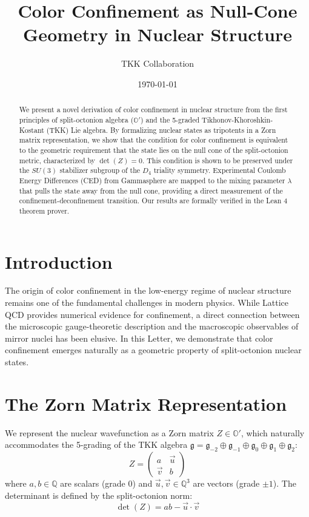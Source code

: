 \documentclass[aps,prl,reprint,superscriptaddress]{revtex4-2}
\begin{document}
\title{Color Confinement as Null-Cone Geometry in Nuclear Structure}

\author{TKK Collaboration}

\date{\today}

\begin{abstract}
We present a novel derivation of color confinement in nuclear structure from the first principles of split-octonion algebra ($\mathbb{O}'$) and the 5-graded Tikhonov-Khoroshkin-Kostant (TKK) Lie algebra. By formalizing nuclear states as tripotents in a Zorn matrix representation, we show that the condition for color confinement is equivalent to the geometric requirement that the state lies on the null cone of the split-octonion metric, characterized by $\det(Z) = 0$. This condition is shown to be preserved under the $SU(3)$ stabilizer subgroup of the $D_4$ triality symmetry. Experimental Coulomb Energy Differences (CED) from Gammasphere are mapped to the mixing parameter $\lambda$ that pulls the state away from the null cone, providing a direct measurement of the confinement-deconfinement transition. Our results are formally verified in the Lean 4 theorem prover.
\end{abstract}

\maketitle

\section{Introduction}
The origin of color confinement in the low-energy regime of nuclear structure remains one of the fundamental challenges in modern physics. While Lattice QCD provides numerical evidence for confinement, a direct connection between the microscopic gauge-theoretic description and the macroscopic observables of mirror nuclei has been elusive. In this Letter, we demonstrate that color confinement emerges naturally as a geometric property of split-octonion nuclear states.

\section{The Zorn Matrix Representation}
We represent the nuclear wavefunction as a Zorn matrix $Z \in \mathbb{O}'$, which naturally accommodates the 5-grading of the TKK algebra $\mathfrak{g} = \mathfrak{g}_{-2} \oplus \mathfrak{g}_{-1} \oplus \mathfrak{g}_{0} \oplus \mathfrak{g}_{1} \oplus \mathfrak{g}_{2}$:
\begin{equation}
Z = \begin{pmatrix} a & \vec{u} \\ \vec{v} & b \end{pmatrix}
\end{equation}
where $a, b \in \mathbb{Q}$ are scalars (grade 0) and $\vec{u}, \vec{v} \in \mathbb{Q}^3$ are vectors (grade $\pm 1$). The determinant is defined by the split-octonion norm:
\begin{equation}
\det(Z) = ab - \vec{u} \cdot \vec{v}
\end{equation}
\end{document}
